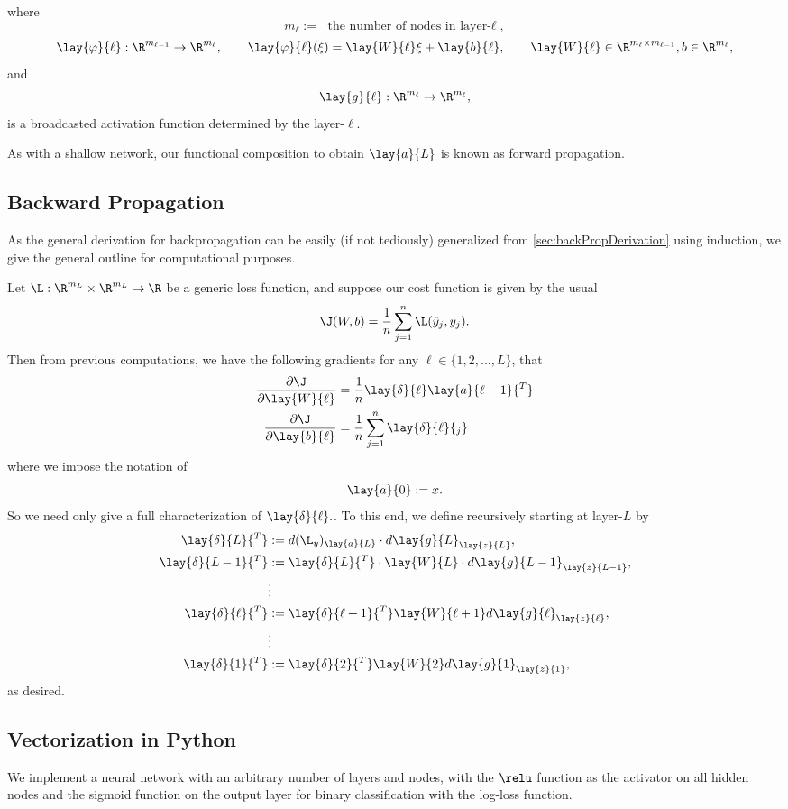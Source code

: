where
$$m_\ell :=\text{ the number of nodes in layer-$\ell$},$$
$$\lay{\varphi}{\ell}:\R^{m_{\ell-1}}\to\R^{m_\ell},\qquad \lay{\varphi}{\ell}(\xi)=\lay{W}{\ell}\xi+\lay{b}{\ell},\qquad \lay{W}{\ell}\in\R^{m_\ell\times m_{\ell-1}},b\in\R^{m_\ell},$$
and
$$\lay{g}{\ell}:\R^{m_\ell}\to\R^{m_\ell},$$
is a broadcasted activation function determined by the layer-$\ell$.

As with a shallow network, our functional composition to obtain $\lay{a}{L}$ is known as forward propagation.

\subsection{Backward Propagation}
As the general derivation for backpropagation can be easily (if not tediously) generalized from \cref{sec:backPropDerivation} using induction, we give the general outline for computational purposes.

Let $\L:\R^{m_L}\times\R^{m_L}\to\R$ be a generic loss function, and suppose our cost function is given by the usual
$$\J(W,b)=\frac{1}{n}\sum_{j=1}^n\L(\hat{y}_j,y_j).$$
Then from previous computations, we have the following gradients for any $\ell\in\{1,2,...,L\}$, that
\begin{align*}
	\frac{\partial\J}{\partial\lay{W}{\ell}}&=\frac{1}{n}\lay{\delta}{\ell}\lay{a}{\ell-1}{^T}\\
	\frac{\partial\J}{\partial\lay{b}{\ell}}&=\frac{1}{n}\sum_{j=1}^n\lay{\delta}{\ell}{_j}
\end{align*}
where we impose the notation of
$$\lay{a}{0}:=x.$$
So we need only give a full characterization of $\lay{\delta}{\ell}.$. To this end, we define recursively starting at layer-$L$ by
\begin{align*}
	\lay{\delta}{L}{^T}&:=d(\L_y)_{\lay{a}{L}}\cdot d\lay{g}{L}_{\lay{z}{L}},\\
	\lay{\delta}{L-1}{^T}&:=\lay{\delta}{L}{^T}\cdot\lay{W}{L}\cdot d\lay{g}{L-1}_{\lay{z}{L-1}},\\
	&\vdots\\
	\lay{\delta}{\ell}{^T}&:=\lay{\delta}{\ell+1}{^T}\lay{W}{\ell+1}d\lay{g}{\ell}_{\lay{z}{\ell}},\\
	&\vdots\\
	\lay{\delta}{1}{^T}&:=\lay{\delta}{2}{^T}\lay{W}{2}d\lay{g}{1}_{\lay{z}{1}},
\end{align*}
as desired.



\subsection{Vectorization in Python}
We implement a neural network with an arbitrary number of layers and nodes, with the $\relu$ function as the activator on all hidden nodes and the sigmoid function on the output layer for binary classification with the log-loss function.

